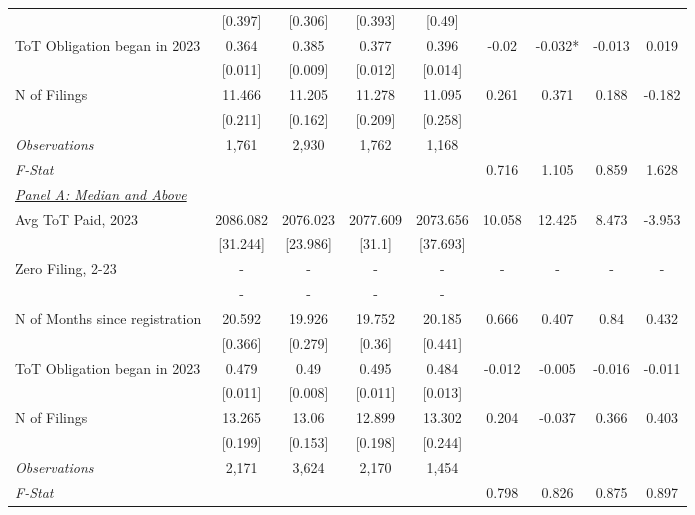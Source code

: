 \begin{tabular}{lcccccccc}
 & {}[0.397] & {}[0.306] & {}[0.393] & {}[0.49] &  &  &  & \\
ToT Obligation began in 2023 & 0.364 & 0.385 & 0.377 & 0.396 & -0.02 & -0.032* & -0.013 & 0.019\\
 & {}[0.011] & {}[0.009] & {}[0.012] & {}[0.014] &  &  &  & \\
N of Filings & 11.466 & 11.205 & 11.278 & 11.095 & 0.261 & 0.371 & 0.188 & -0.182\\
 & {}[0.211] & {}[0.162] & {}[0.209] & {}[0.258] &  &  &  & \\
\midrule
\textit{Observations} & 1,761 & 2,930 & 1,762 & 1,168 &  &  &  & \\
\textit{F-Stat} &  &  &  &  & 0.716 & 1.105 & 0.859 & 1.628\\
\midrule
\multicolumn{1}{l}{\underline{\textit{Panel A: Median and Above}}} & & & & & & & & \\ 
 \addlinespace 
Avg ToT Paid, 2023 & 2086.082 & 2076.023 & 2077.609 & 2073.656 & 10.058 & 12.425 & 8.473 & -3.953\\
 & {}[31.244] & {}[23.986] & {}[31.1] & {}[37.693] &  &  &  & \\
Zero Filing, 2-23 & - & - & - & - & - & - & - & -\\
 & {}- & {}- & {}- & {}- &  &  &  & \\
N of Months since registration & 20.592 & 19.926 & 19.752 & 20.185 & 0.666 & 0.407 & 0.84 & 0.432\\
 & {}[0.366] & {}[0.279] & {}[0.36] & {}[0.441] &  &  &  & \\
ToT Obligation began in 2023 & 0.479 & 0.49 & 0.495 & 0.484 & -0.012 & -0.005 & -0.016 & -0.011\\
 & {}[0.011] & {}[0.008] & {}[0.011] & {}[0.013] &  &  &  & \\
N of Filings & 13.265 & 13.06 & 12.899 & 13.302 & 0.204 & -0.037 & 0.366 & 0.403\\
 & {}[0.199] & {}[0.153] & {}[0.198] & {}[0.244] &  &  &  & \\
\midrule
\textit{Observations} & 2,171 & 3,624 & 2,170 & 1,454 &  &  &  & \\
\textit{F-Stat} &  &  &  &  & 0.798 & 0.826 & 0.875 & 0.897\\
\bottomrule
\end{tabular}
